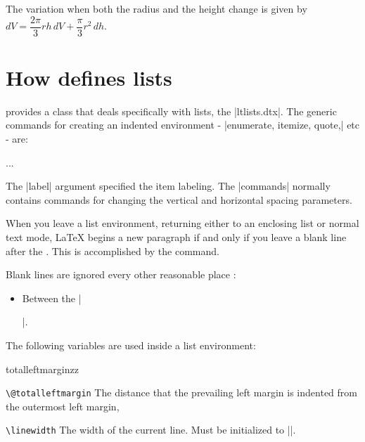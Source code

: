 The variation when both the radius and the height
change is given by $dV = \dfrac{2\pi}{3} rh\, dV + \dfrac{\pi}{3} r^2\, dh$.


\section{How \protect\LaTeXe defines lists}
\normalsize

\latex provides a class that deals specifically with lists, the |ltlists.dtx|. The generic commands for creating an indented environment - |enumerate, itemize, quote,| etc - are:

\begin{teX}
 ...\endlist
\end{teX}

The |label| argument specified the item labeling. The |commands| normally contains commands for changing the vertical and horizontal spacing parameters.

When you leave a list environment, returning either to an enclosing list or
normal text mode, LaTeX begins a new paragraph if and only if you leave a blank
line after the . This is accomplished by the \hlred{\@endparenv}
 command.

Blank lines are ignored every other reasonable place \ie :

\begin{itemize}
\item Between the ||.
\end{itemize}


The following variables are used inside a list environment:

\begin{definitions}{totalleftmarginzz}
\item [\texttt{\textbackslash @totalleftmargin}] The distance that the prevailing left margin is indented from the outermost left margin,

\item [\texttt{\textbackslash linewidth}] The width of the current line. Must be initialized to |\hsize|.

\end{definitions}






